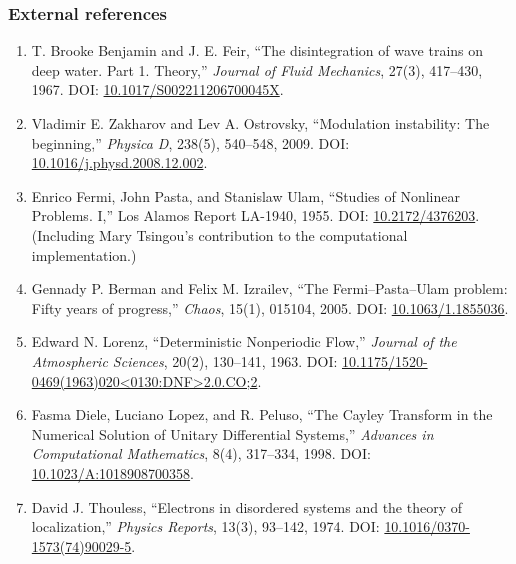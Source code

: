 \documentclass[
  a4paper,
]{article}
\providecommand{\tightlist}{%
  \setlength{\itemsep}{0pt}\setlength{\parskip}{0pt}}
\begin{document}
\subsubsection{External references}\label{external-references}

\begin{enumerate}
\def\labelenumi{\arabic{enumi}.}
\setcounter{enumi}{4}
\tightlist
\item
  T. Brooke Benjamin and J. E. Feir, ``The disintegration of wave trains
  on deep water. Part 1. Theory,'' \emph{Journal of Fluid Mechanics},
  27(3), 417--430, 1967. DOI:
  \href{https://doi.org/10.1017/S002211206700045X}{10.1017/S002211206700045X}.
\item
  Vladimir E. Zakharov and Lev A. Ostrovsky, ``Modulation instability:
  The beginning,'' \emph{Physica D}, 238(5), 540--548, 2009. DOI:
  \href{https://doi.org/10.1016/j.physd.2008.12.002}{10.1016/j.physd.2008.12.002}.
\item
  Enrico Fermi, John Pasta, and Stanislaw Ulam, ``Studies of Nonlinear
  Problems. I,'' Los Alamos Report LA-1940, 1955. DOI:
  \href{https://doi.org/10.2172/4376203}{10.2172/4376203}. (Including
  Mary Tsingou's contribution to the computational implementation.)
\item
  Gennady P. Berman and Felix M. Izrailev, ``The Fermi--Pasta--Ulam
  problem: Fifty years of progress,'' \emph{Chaos}, 15(1), 015104, 2005.
  DOI: \href{https://doi.org/10.1063/1.1855036}{10.1063/1.1855036}.
\item
  Edward N. Lorenz, ``Deterministic Nonperiodic Flow,'' \emph{Journal of
  the Atmospheric Sciences}, 20(2), 130--141, 1963. DOI:
  \href{https://doi.org/10.1175/1520-0469(1963)020\%3C0130:DNF\%3E2.0.CO;2}{10.1175/1520-0469(1963)020\textless0130:DNF\textgreater2.0.CO;2}.
\item
  Fasma Diele, Luciano Lopez, and R. Peluso, ``The Cayley Transform in
  the Numerical Solution of Unitary Differential Systems,''
  \emph{Advances in Computational Mathematics}, 8(4), 317--334, 1998.
  DOI:
  \href{https://doi.org/10.1023/A:1018908700358}{10.1023/A:1018908700358}.
\item
  David J. Thouless, ``Electrons in disordered systems and the theory of
  localization,'' \emph{Physics Reports}, 13(3), 93--142, 1974. DOI:
  \href{https://doi.org/10.1016/0370-1573(74)90029-5}{10.1016/0370-1573(74)90029-5}.
\end{enumerate}
\end{document}
